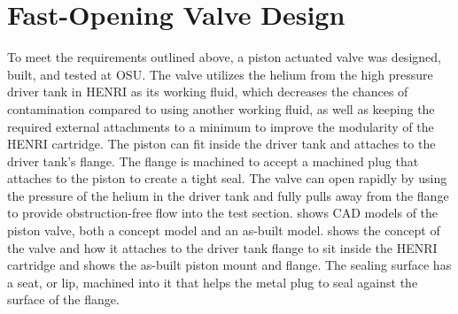 \section{Fast-Opening Valve Design} \label{s:design}


To meet the requirements outlined above, a piston actuated valve was designed, built, and tested at OSU.
The valve utilizes the helium from the high pressure driver tank in HENRI as its working fluid, which decreases the chances of contamination compared to using another working fluid, as well as keeping the required external attachments to a minimum to improve the modularity of the HENRI cartridge.
The piston can fit inside the driver tank and attaches to the driver tank's flange.
The flange is machined to accept a machined plug that attaches to the piston to create a tight seal.
The valve can open rapidly by using the pressure of the helium in the driver tank and fully pulls away from the flange to provide obstruction-free flow into the test section.
 shows CAD models of the piston valve, both a concept model and an as-built model.
 shows the concept of the valve and how it attaches to the driver tank flange to sit inside the HENRI cartridge and  shows the as-built piston mount and flange.
The sealing surface has a seat, or lip, machined into it that helps the metal plug to seal against the surface of the flange.


